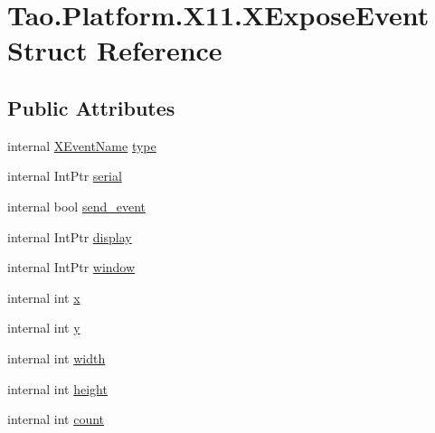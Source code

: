\hypertarget{struct_tao_1_1_platform_1_1_x11_1_1_x_expose_event}{
\section{Tao.Platform.X11.XExposeEvent Struct Reference}
\label{struct_tao_1_1_platform_1_1_x11_1_1_x_expose_event}
}
\subsection*{Public Attributes}
\begin{DoxyCompactItemize}
\item 
internal \hyperlink{namespace_tao_1_1_platform_1_1_x11_aff81ed5b8778e1ea8e872861dff9f146}{XEventName} \hyperlink{struct_tao_1_1_platform_1_1_x11_1_1_x_expose_event_a3323574aee7f9c97a51e65781866cf0b}{type}
\item 
internal IntPtr \hyperlink{struct_tao_1_1_platform_1_1_x11_1_1_x_expose_event_a4ba9cba9068637170859c51bcd10ae06}{serial}
\item 
internal bool \hyperlink{struct_tao_1_1_platform_1_1_x11_1_1_x_expose_event_acb7420b836cfa08e1d8a6534db045e03}{send\_\-event}
\item 
internal IntPtr \hyperlink{struct_tao_1_1_platform_1_1_x11_1_1_x_expose_event_a909f7261d6c421106c10f2281c3d28cc}{display}
\item 
internal IntPtr \hyperlink{struct_tao_1_1_platform_1_1_x11_1_1_x_expose_event_a3272e69253de6126d1435b738e9318b5}{window}
\item 
internal int \hyperlink{struct_tao_1_1_platform_1_1_x11_1_1_x_expose_event_a4d2698124160d8bf10eee02399e1c3ca}{x}
\item 
internal int \hyperlink{struct_tao_1_1_platform_1_1_x11_1_1_x_expose_event_a47b92e32b09eca580a826f874be52e3c}{y}
\item 
internal int \hyperlink{struct_tao_1_1_platform_1_1_x11_1_1_x_expose_event_ab4e251c44f99bca3fec948f7701f9e45}{width}
\item 
internal int \hyperlink{struct_tao_1_1_platform_1_1_x11_1_1_x_expose_event_adfb7c26d8f6ce9a49e7392ffde2f9012}{height}
\item 
internal int \hyperlink{struct_tao_1_1_platform_1_1_x11_1_1_x_expose_event_aed934096f871a622d2d313840907d4f2}{count}
\end{DoxyCompactItemize}


